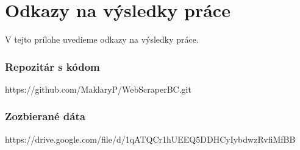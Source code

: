 

\chapter{Odkazy na výsledky práce}

V tejto prílohe uvedieme odkazy na výsledky práce. 

\subsection{Repozitár s kódom}

https://github.com/MaklaryP/WebScraperBC.git

\subsection{Zozbierané dáta}

https://drive.google.com/file/d/1qATQCr1hUEEQ5DDHCyIybdwzRvfiMfBB